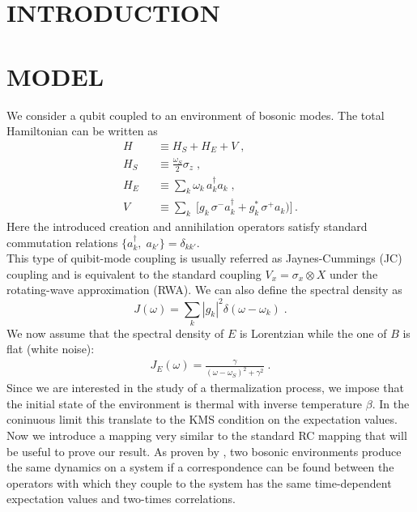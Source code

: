 \documentclass[%
 reprint,
 amsmath,amssymb,
 aps,
]{revtex4-2}
\begin{document}

\section{INTRODUCTION}

\section{MODEL}
We consider a qubit coupled to an environment of bosonic modes. The total Hamiltonian can be written as 
\begin{eqnarray}
H &&\equiv  H_S + H_E + V \; ,
\\
H_S &&\equiv \frac{\omega_S}{2} \sigma_z \; ,
\\
H_E &&\equiv \sum_k \omega_k \,  a^\dagger _k a_k \; ,
\\
V &&\equiv \sum_k \; \Big[ g_k \, \sigma^- a^\dagger_k + g_k^* \,\sigma^+ a_k \big) \Big] \, . 
\end{eqnarray}
Here the introduced creation and annihilation operators satisfy standard commutation relations $\{ a_k^\dagger, \; a_{k'} \}= \delta_{kk'}$. \\
This type of quibit-mode coupling is usually referred as Jaynes-Cummings (JC) coupling and is equivalent to the standard coupling $V_x= \sigma_x \otimes X$ under the rotating-wave approximation (RWA). We can also define the spectral density as
\begin{equation}
    J(\omega)= \sum_k|g_k|^2 \delta (\omega-\omega_k) \; .
\end{equation}
We now assume that the spectral density of $E $ is Lorentzian while the one of $B$ is flat (white noise):
\begin{eqnarray}
    J_E(\omega)= \frac{ \gamma}{ (\omega - \omega_S) ^2 + \gamma^2} \; .
\end{eqnarray}
Since we are interested in the study of a thermalization process, we impose that the initial state of the environment is thermal with inverse temperature $\beta$. In the coninuous limit this translate to the KMS condition on the expectation values. \\
Now we introduce a mapping very similar to the standard RC mapping that will be useful to prove our result. As proven by \cite{Tamascelli2017-hx}, two bosonic environments produce the same dynamics on a system if a correspondence can be found between the operators with which they couple to the system has the same time-dependent expectation values and two-times correlations.\\
\end{document}
